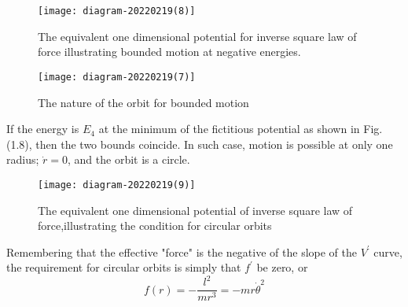 \begin{minipage}{0.5\textwidth}
	\begin{figure}[H]
		\centering
		\texttt{[image: diagram-20220219(8)]}
		\caption{The equivalent one dimensional potential for inverse square law of force illustrating bounded motion at negative energies.}
		\label{}
	\end{figure}
\end{minipage}
\begin{minipage}{0.5\textwidth}
\begin{figure}[H]
	\centering
	\texttt{[image: diagram-20220219(7)]}
	\caption{The nature of the orbit for bounded motion}
	\label{}
\end{figure}
\end{minipage}
\par If the energy is $E_{4}$ at the minimum of the fictitious potential as shown in Fig. (1.8), then the two bounds coincide. In such case, motion is possible at only one radius; $\dot{r}=0$, and the orbit is a circle.
\begin{figure}[H]
	\centering
	\texttt{[image: diagram-20220219(9)]}
	\caption{The equivalent one dimensional potential of inverse square law of force,illustrating the condition for circular orbits}
	\label{}
\end{figure}
 Remembering that the effective "force" is the negative of the slope of the $V^{\prime}$ curve, the requirement for circular orbits is simply that $f^{\prime}$ be zero, or
$$
f(r)=-\frac{l^{2}}{m r^{3}}=-m r \dot{\theta}^{2}
$$
